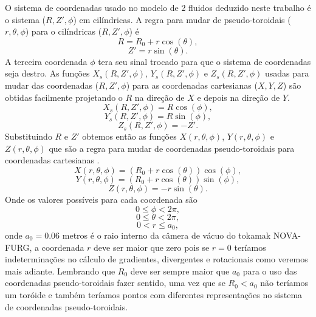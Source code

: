 \documentclass[12pt,oneside,a4paper]{abntex2}
\begin{document}
O sistema de coordenadas usado no modelo de 2 fluidos deduzido neste trabalho é o sistema ($R,Z',\phi$) em cilíndricas. A regra para mudar de pseudo-toroidais ($r,\theta,\phi$) para o cilíndricas ($R,Z',\phi$) é
\begin{equation}
\label{regrapseudo1}
 R = R_0+r \cos(\theta),
\end{equation}
\begin{equation}
\label{regrapseudo2}
 Z' = r \sin(\theta).
 \end{equation}
A terceira coordenada $\phi$ tera seu sinal trocado para que o sistema de coordenadas seja destro. As funções $X_s(R,Z',\phi)$, $Y_s(R,Z',\phi)$ e $Z_s(R,Z',\phi)$ usadas para mudar das coordenadas ($R,Z',\phi$) para as coordenadas cartesianas ($X,Y,Z$) são obtidas facilmente projetando o $R$ na direção de $X$ e depois na direção de $Y$.
\begin{equation}
X_s(R,Z',\phi) = R \cos(\phi),
\end{equation}
\begin{equation}
Y_s(R,Z',\phi) = R \sin(\phi),
\end{equation}
\begin{equation}
Z_s(R,Z',\phi) = -Z'.
\end{equation}
Substituindo $R$ e $Z'$ obtemos então as funções $X(r,\theta,\phi)$, $Y(r,\theta,\phi)$ e $Z(r,\theta,\phi)$ que são a regra para mudar de coordenadas pseudo-toroidais para coordenadas cartesianas \cite{RevModPhys.48.239}.
\begin{equation}
\label{rX}
X(r,\theta,\phi) = (R_0+r \cos(\theta)) \cos(\phi),
\end{equation}
\begin{equation}
\label{rY}
Y(r,\theta,\phi) = (R_0+r \cos(\theta)) \sin(\phi),
\end{equation}
\begin{equation}
\label{rZ}
Z(r,\theta,\phi) = -r \sin(\theta).
\end{equation}
Onde os valores possíveis para cada coordenada são
\begin{equation}
0 \leq \phi < 2 \pi,
\end{equation}
\begin{equation}
0 \leq \theta < 2 \pi,
\end{equation}
\begin{equation}
\label{maxr}
0 < r \leq a_0,
\end{equation}
onde $a_0=0.06$ metros é o raio interno da câmera de vácuo do tokamak NOVA-FURG, a coordenada $r$ deve ser maior que zero pois se $r=0$ teríamos indeterminações no cálculo de gradientes, divergentes e rotacionais como veremos mais adiante. Lembrando que $R_0$ deve ser sempre maior que $a_0$ para o uso das coordenadas pseudo-toroidais fazer sentido, uma vez que se $R_0<a_0$ não teríamos um toróide e também teríamos pontos com diferentes representações no sistema de coordenadas pseudo-toroidais.
\end{document}
